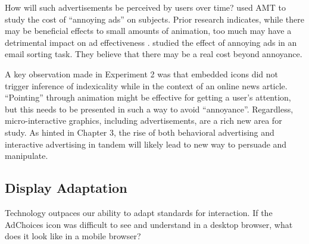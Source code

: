 How will such advertisements be perceived by users over time?  \citet{Goldstein:2013ww}  used AMT to study the cost of ``annoying ads'' on subjects. Prior research indicates, while there may be beneficial effects to small amounts of animation, too much may have a detrimental impact on ad effectiveness  \citep{Dreze:2003is,Goldfarb:2011kh,Buscher:2010uo}. \citet{Goldstein:2013ww}  studied the effect of annoying ads in an email sorting task. They believe that there may be a real cost beyond annoyance.

A key observation made in Experiment 2 was that embedded icons did not trigger inference of indexicality while in the context of an online news article. ``Pointing'' through animation might be effective for getting a user's attention, but this needs to be presented in such a way to avoid ``annoyance''. Regardless, micro-interactive graphics, including advertisements, are a rich new area for study. As hinted in Chapter 3, the rise of both behavioral advertising and interactive advertising in tandem will likely lead to new way to persuade and manipulate.

\subsection{Display Adaptation}
\label{displayadaptation}

Technology outpaces our ability to adapt standards for interaction. If the AdChoices icon was difficult to see and understand in a desktop browser, what does it look like in a mobile browser?


